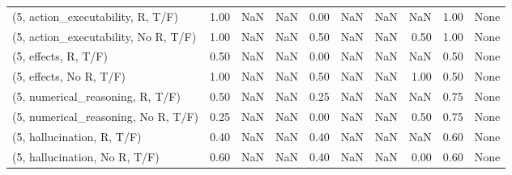 \begin{table*}[h!]
\begin{adjustbox}{width=2\columnwidth,center}
\begin{tabular}{lrrr|rrr|rrr}
(5, action\_executability, R, T/F)    &                      1.00 &                   NaN &                       NaN &                          0.00 &                       NaN &                           NaN &                                    NaN &                               1.00 &                                  None \\
(5, action\_executability, No R, T/F) &                      1.00 &                   NaN &                       NaN &                          0.50 &                       NaN &                           NaN &                                   0.50 &                               1.00 &                                  None \\
(5, effects, R, T/F)                 &                      0.50 &                   NaN &                       NaN &                          0.00 &                       NaN &                           NaN &                                    NaN &                               0.50 &                                  None \\
(5, effects, No R, T/F)              &                      1.00 &                   NaN &                       NaN &                          0.50 &                       NaN &                           NaN &                                   1.00 &                               0.50 &                                  None \\
(5, numerical\_reasoning, R, T/F)     &                      0.50 &                   NaN &                       NaN &                          0.25 &                       NaN &                           NaN &                                    NaN &                               0.75 &                                  None \\
(5, numerical\_reasoning, No R, T/F)  &                      0.25 &                   NaN &                       NaN &                          0.00 &                       NaN &                           NaN &                                   0.50 &                               0.75 &                                  None \\
(5, hallucination, R, T/F)           &                      0.40 &                   NaN &                       NaN &                          0.40 &                       NaN &                           NaN &                                    NaN &                               0.60 &                                  None \\
(5, hallucination, No R, T/F)        &                      0.60 &                   NaN &                       NaN &                          0.40 &                       NaN &                           NaN &                                   0.00 &                               0.60 &                                  None \\

\end{tabular}
\end{adjustbox}
\end{table*}

